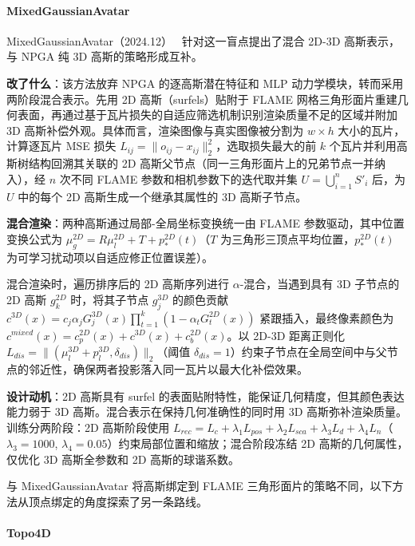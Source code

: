 \paragraph{MixedGaussianAvatar}

MixedGaussianAvatar（2024.12）~\cite{2412_04955} 针对这一盲点提出了混合 2D-3D 高斯表示，与 NPGA 纯 3D 高斯的策略形成互补。

\textbf{改了什么}：该方法放弃 NPGA 的逐高斯潜在特征和 MLP 动力学模块，转而采用两阶段混合表示。先用 2D 高斯（surfels）贴附于 FLAME 网格三角形面片重建几何表面，再通过基于瓦片损失的自适应筛选机制识别渲染质量不足的区域并附加 3D 高斯补偿外观。具体而言，渲染图像与真实图像被分割为 $w \times h$ 大小的瓦片，计算逐瓦片 MSE 损失 $L_{ij} = \|o_{ij} - x_{ij}\|_2^2$，选取损失最大的前 $k$ 个瓦片并利用高斯树结构回溯其关联的 2D 高斯父节点（同一三角形面片上的兄弟节点一并纳入），经 $n$ 次不同 FLAME 参数和相机参数下的迭代取并集 $U = \bigcup_{i=1}^{n} S'_i$ 后，为 $U$ 中的每个 2D 高斯生成一个继承其属性的 3D 高斯子节点。

\textbf{混合渲染}：两种高斯通过局部-全局坐标变换统一由 FLAME 参数驱动，其中位置变换公式为 $\mu_g^{2D} = R \mu_l^{2D} + T + p^{2D}_*(t)$（$T$ 为三角形三顶点平均位置，$p^{2D}_*(t)$ 为可学习扰动项以自适应修正位置误差）。

混合渲染时，遍历排序后的 2D 高斯序列进行 $\alpha$-混合，当遇到具有 3D 子节点的 2D 高斯 $g_k^{2D}$ 时，将其子节点 $g_j^{3D}$ 的颜色贡献 $c^{3D}(x) = c_j \alpha_j G^{3D}_j(x) \prod_{t=1}^{k}(1 - \alpha_t G^{2D}_t(x))$ 紧跟插入，最终像素颜色为 $c^{mixed}(x) = c_p^{2D}(x) + c^{3D}(x) + c_b^{2D}(x)$。以 2D-3D 距离正则化 $L_{dis} = \|(\mu_l^{3D} + p_l^{3D}, \delta_{dis})\|_2$（阈值 $\delta_{dis}=1$）约束子节点在全局空间中与父节点的邻近性，确保两者投影落入同一瓦片以最大化补偿效果。

\textbf{设计动机}：2D 高斯具有 surfel 的表面贴附特性，能保证几何精度，但其颜色表达能力弱于 3D 高斯。混合表示在保持几何准确性的同时用 3D 高斯弥补渲染质量。训练分两阶段：2D 高斯阶段使用 $L_{rec} = L_c + \lambda_1 L_{pos} + \lambda_2 L_{sca} + \lambda_3 L_d + \lambda_4 L_n$（$\lambda_3=1000$, $\lambda_4=0.05$）约束局部位置和缩放；混合阶段冻结 2D 高斯的几何属性，仅优化 3D 高斯全参数和 2D 高斯的球谐系数。

与 MixedGaussianAvatar 将高斯绑定到 FLAME 三角形面片的策略不同，以下方法从顶点绑定的角度探索了另一条路线。

\paragraph{Topo4D}

